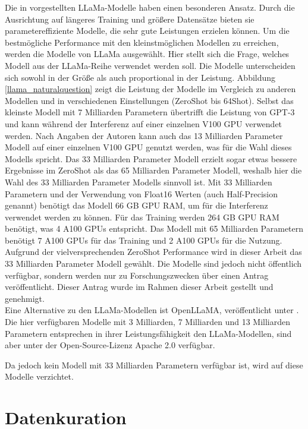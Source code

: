 Die in \citet{llama} vorgestellten LLaMa-Modelle haben einen besonderen Ansatz.
Durch die Ausrichtung auf längeres Training und größere Datensätze bieten sie parametereffiziente Modelle, die sehr gute Leistungen erzielen können.
Um die bestmögliche Performance mit den kleinstmöglichen Modellen zu erreichen, werden die Modelle von LLaMa ausgewählt.
Hier stellt sich die Frage, welches Modell aus der LLaMa-Reihe verwendet werden soll.
Die Modelle unterscheiden sich sowohl in der Größe als auch proportional in der Leistung.
Abbildung \ref{llama_naturalquestion} zeigt die Leistung der Modelle im Vergleich zu anderen Modellen und in verschiedenen Einstellungen (ZeroShot bis 64Shot).
Selbst das kleinste Modell mit 7 Milliarden Parametern übertrifft die Leistung von GPT-3 und kann während der Interferenz auf einer einzelnen V100 GPU verwendet werden.
Nach Angaben der Autoren kann auch das 13 Milliarden Parameter Modell auf einer einzelnen V100 GPU genutzt werden, was für die Wahl dieses Modells spricht.
Das 33 Milliarden Parameter Modell erzielt sogar etwas bessere Ergebnisse im ZeroShot als das 65 Milliarden Parameter Modell, weshalb hier die Wahl des 33 Milliarden Parameter Modells sinnvoll ist.
Mit 33 Milliarden Parametern und der Verwendung von Float16 Werten (auch Half-Precision genannt) benötigt das Modell 66 GB GPU RAM, um für die Interferenz verwendet werden zu können.
Für das Training werden 264 GB GPU RAM benötigt, was 4 A100 GPUs entspricht.
Das Modell mit 65 Milliarden Parametern benötigt 7 A100 GPUs für das Training und 2 A100 GPUs für die Nutzung.
Aufgrund der vielversprechenden ZeroShot Performance wird in dieser Arbeit das 33 Milliarden Parameter Modell gewählt.
Die Modelle sind jedoch nicht öffentlich verfügbar, sondern werden nur zu Forschungszwecken über einen Antrag veröffentlicht.
Dieser Antrag wurde im Rahmen dieser Arbeit gestellt und genehmigt.\\

Eine Alternative zu den LLaMa-Modellen ist OpenLLaMA, veröffentlicht unter \citet{openllama}.
Die hier verfügbaren Modelle mit 3 Milliarden, 7 Milliarden und 13 Milliarden Parametern entsprechen in ihrer Leistungsfähigkeit den LLaMa-Modellen, sind aber unter der Open-Source-Lizenz Apache 2.0 verfügbar.

Da jedoch kein Modell mit 33 Milliarden Parametern verfügbar ist, wird auf diese Modelle verzichtet.\\

\section{Datenkuration}

